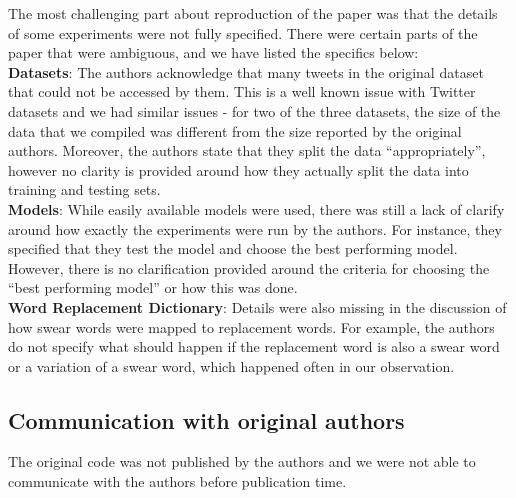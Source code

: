 The most challenging part about reproduction of the paper was that the details of some experiments were not fully specified. There were certain parts of the paper that were ambiguous, and we have listed the specifics below:
\\

\textbf{Datasets}:
The authors acknowledge that many tweets in the original dataset that could not be accessed by them. This is a well known issue with Twitter datasets and we had similar issues - for two of the three datasets, the size of the data that we compiled was different from the size reported by the original authors. Moreover, the authors state that they split the data ``appropriately'', however no clarity is provided around how they actually split the data into training and testing sets.
\\

\textbf{Models}: While easily available models were used, there was still a lack of clarify around how exactly the experiments were run by the authors. For instance, they specified that they test the model and choose the best performing model. However, there is no clarification provided around the criteria for choosing the ``best performing model'' or how this was done.
\\

\textbf{Word Replacement Dictionary}: Details were also missing in the discussion of how swear words were mapped to replacement words. For example, the authors do not specify what should happen if the replacement word is also a swear word or a variation of a swear word, which happened often in our observation.

\subsection{Communication with original authors}
The original code was not published by the authors and we were not able to communicate with the authors before publication time.
